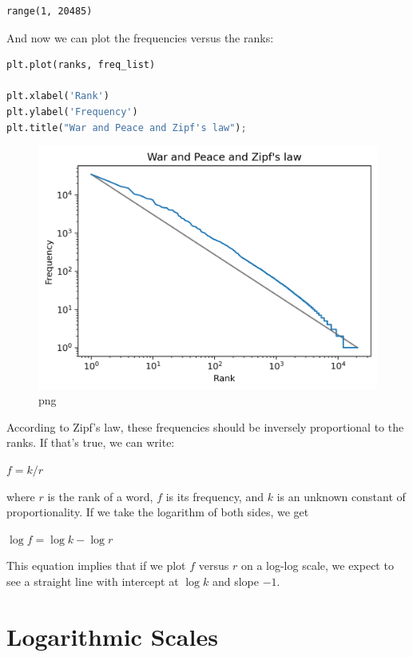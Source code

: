 \documentclass[
]{book}
\begin{document}
\begin{lstlisting}
range(1, 20485)
\end{lstlisting}

And now we can plot the frequencies versus the ranks:

\begin{lstlisting}[language=Python]
plt.plot(ranks, freq_list)

plt.xlabel('Rank')
plt.ylabel('Frequency')
plt.title("War and Peace and Zipf's law");
\end{lstlisting}

\begin{figure}
\centering
\includegraphics{06_plotting_files/06_plotting_83_0.png}
\caption{png}
\end{figure}

According to Zipf's law, these frequencies should be inversely
proportional to the ranks. If that's true, we can write:

\(f = k / r\)

where \(r\) is the rank of a word, \(f\) is its frequency, and \(k\) is
an unknown constant of proportionality. If we take the logarithm of both
sides, we get

\(\log f = \log k - \log r\)

This equation implies that if we plot \(f\) versus \(r\) on a log-log
scale, we expect to see a straight line with intercept at \(\log k\) and
slope \(-1\).

\section{Logarithmic Scales}\label{logarithmic-scales}
\end{document}
